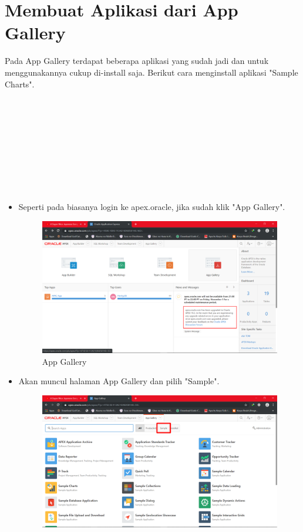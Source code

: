 \documentclass[12pt, times new roman]{article}
\begin{document}
\section{Membuat Aplikasi dari App Gallery}
Pada App Gallery terdapat beberapa aplikasi yang sudah jadi dan untuk menggunakannya cukup di-install saja. Berikut cara menginstall aplikasi "Sample Charts".
\\
\\
\\
\\
\\
\\
\\
\\
\\
\\
\begin{itemize}
\item Seperti pada biasanya login ke apex.oracle, jika sudah klik "App Gallery".
\begin{figure}[!htpb]
	\centering
	\includegraphics[width=12cm]{figures/Screenshot_24.png}
	\caption{App Gallery}
\end{figure}
\item Akan muncul halaman App Gallery dan pilih "Sample".
\begin{figure}[!htpb]
	\centering
	\includegraphics[width=12cm]{figures/Screenshot_25.png}

\end{figure}
\end{itemize}
\end{document}
